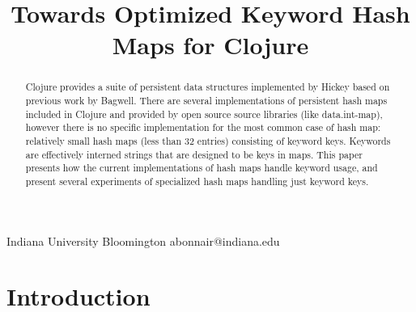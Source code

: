 \documentclass[preprint]{sigplanconf}
\begin{document}

%

           { Indiana University Bloomington }
           { abonnair@indiana.edu}


\title{Towards Optimized Keyword Hash Maps for Clojure}

\maketitle

\begin{abstract}
Clojure provides a suite of persistent data structures
implemented by Hickey based on previous work by Bagwell.
There are several implementations of persistent hash maps
included in Clojure and provided by open source source libraries
(like data.int-map), however there is no specific
implementation for the most common case of hash map:
relatively small hash maps (less than 32 entries)
consisting of keyword keys.
Keywords are effectively interned strings that are designed
to be keys in maps.
This paper presents how the current implementations
of hash maps handle keyword usage, 
and present several experiments of specialized hash maps
handling just keyword keys.

\end{abstract}


\section{Introduction}
\end{document}
